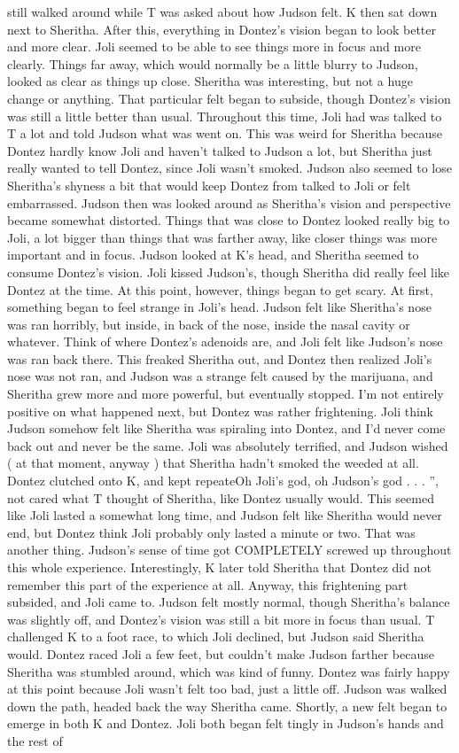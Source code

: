 \documentclass[12pt]{book}
\begin{document}
still walked around while T was asked about how Judson felt. K then sat down next to Sheritha. After this, everything in Dontez's vision began to look better and more clear. Joli seemed to be able to see things more in focus and more clearly. Things far away, which would normally be a little blurry to Judson, looked as clear as things up close. Sheritha was interesting, but not a huge change or anything. That particular felt began to subside, though Dontez's vision was still a little better than usual. Throughout this time, Joli had was talked to T a lot and told Judson what was went on. This was weird for Sheritha because Dontez hardly know Joli and haven't talked to Judson a lot, but Sheritha just really wanted to tell Dontez, since Joli wasn't smoked. Judson also seemed to lose Sheritha's shyness a bit that would keep Dontez from talked to Joli or felt embarrassed. Judson then was looked around as Sheritha's vision and perspective became somewhat distorted. Things that was close to Dontez looked really big to Joli, a lot bigger than things that was farther away, like closer things was more important and in focus. Judson looked at K's head, and Sheritha seemed to consume Dontez's vision. Joli kissed Judson's, though Sheritha did really feel like Dontez at the time. At this point, however, things began to get scary. At first, something began to feel strange in Joli's head. Judson felt like Sheritha's nose was ran horribly, but inside, in back of the nose, inside the nasal cavity or whatever. Think of where Dontez's adenoids are, and Joli felt like Judson's nose was ran back there. This freaked Sheritha out, and Dontez then realized Joli's nose was not ran, and Judson was a strange felt caused by the marijuana, and Sheritha grew more and more powerful, but eventually stopped. I'm not entirely positive on what happened next, but Dontez was rather frightening. Joli think Judson somehow felt like Sheritha was spiraling into Dontez, and I'd never come back out and never be the same. Joli was absolutely terrified, and Judson wished ( at that moment, anyway ) that Sheritha hadn't smoked the weeded at all. Dontez clutched onto K, and kept repeateOh Joli's god, oh Judson's god . . . '', not cared what T thought of Sheritha, like Dontez usually would. This seemed like Joli lasted a somewhat long time, and Judson felt like Sheritha would never end, but Dontez think Joli probably only lasted a minute or two. That was another thing. Judson's sense of time got COMPLETELY screwed up throughout this whole experience. Interestingly, K later told Sheritha that Dontez did not remember this part of the experience at all. Anyway, this frightening part subsided, and Joli came to. Judson felt mostly normal, though Sheritha's balance was slightly off, and Dontez's vision was still a bit more in focus than usual. T challenged K to a foot race, to which Joli declined, but Judson said Sheritha would. Dontez raced Joli a few feet, but couldn't make Judson farther because Sheritha was stumbled around, which was kind of funny. Dontez was fairly happy at this point because Joli wasn't felt too bad, just a little off. Judson was walked down the path, headed back the way Sheritha came. Shortly, a new felt began to emerge in both K and Dontez. Joli both began felt tingly in Judson's hands and the rest of 
\end{document}
